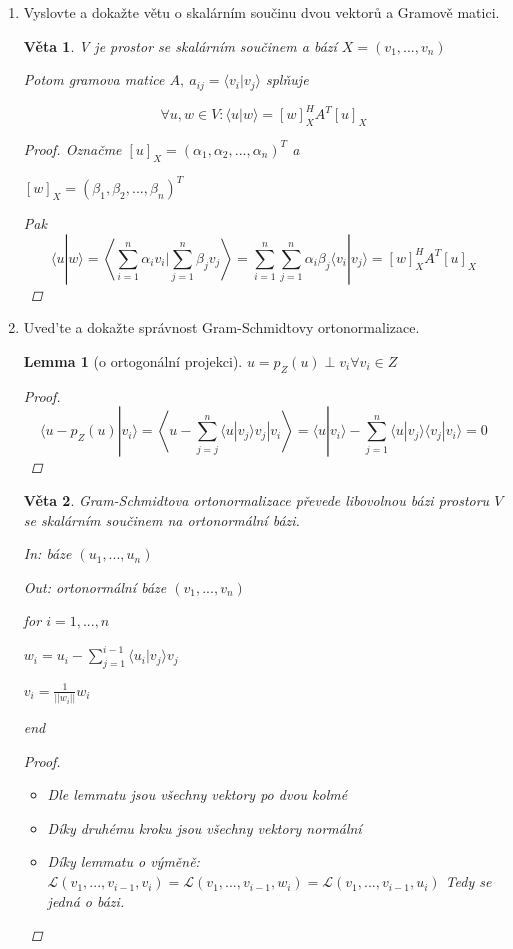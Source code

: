 \documentclass[10pt,a4paper]{article}
\newtheorem{lemma}{Lemma}
\theoremstyle{plain}
\newtheorem{veta}{Věta}
\begin{document}
\begin{enumerate}
\item Vyslovte a dokažte větu o skalárním součinu dvou vektorů a Gramově matici.


\begin{veta}
V je prostor se skalárním součinem a bází $X = (v_1, ..., v_n)$

Potom gramova matice $A,\ a_{ij} = \langle v_i | v_j \rangle$ splňuje

\[ \forall u,w \in V: \langle u | w \rangle = [w]_X^H A^T [u]_X \]
\begin{proof}
Označme $[u]_X = (\alpha_1, \alpha_2, ..., \alpha_n)^T$ a

$[w]_X = (\beta_1, \beta_2, ..., \beta_n)^T$

Pak
\[  \langle u | w \rangle = \left\langle \sum^n_{i=1} \alpha_i v_i | \sum^n_{j=1} \beta_j v_j \right\rangle = \sum^n_{i=1}\sum^n_{j=1} \alpha_i \beta_j  \langle v_i |  v_j \rangle = [w]_X^H A^T [u]_X \]

\end{proof}
\end{veta}

\item Uved'te a dokažte správnost Gram-Schmidtovy ortonormalizace.

\begin{lemma}[o ortogonální projekci] $u = p_Z(u) \perp v_i \forall v_i \in Z$
\begin{proof}
\[   \langle u - p_Z(u) | v_i \rangle =  \left\langle u - \sum_{j=j}^n  \langle u | v_j \rangle v_j | v_i \right\rangle = \langle u | v_i \rangle - \sum_{j=1}^n  \langle u | v_j \rangle \langle v_j | v_i \rangle = 0  \]
\end{proof}
\end{lemma}

\begin{veta} Gram-Schmidtova ortonormalizace převede libovolnou bázi prostoru $V$ se skalárním součinem na ortonormální bázi. 

In: báze $(u_1, ..., u_n)$

Out: ortonormální báze $(v_1, ..., v_n)$

for $i = 1, ..., n$

$w_i = u_i - \sum^{i-1}_{j = 1} \langle u_i | v_j \rangle v_j$

$v_i = \frac1{||w_i||} w_i$

end
\begin{proof}
\begin{itemize}
\item Dle lemmatu jsou všechny vektory po dvou kolmé
\item Díky druhému kroku jsou všechny vektory normální
\item Díky lemmatu o výměně: $\mathcal{L}(v_1, ..., v_{i-1}, v_i) = \mathcal{L}(v_1, ..., v_{i-1}, w_i) =  \mathcal{L}(v_1, ..., v_{i-1}, u_i) $ Tedy se jedná o bázi.
\end{itemize}
\end{proof}
\end{veta}



\end{enumerate}
\end{document}
